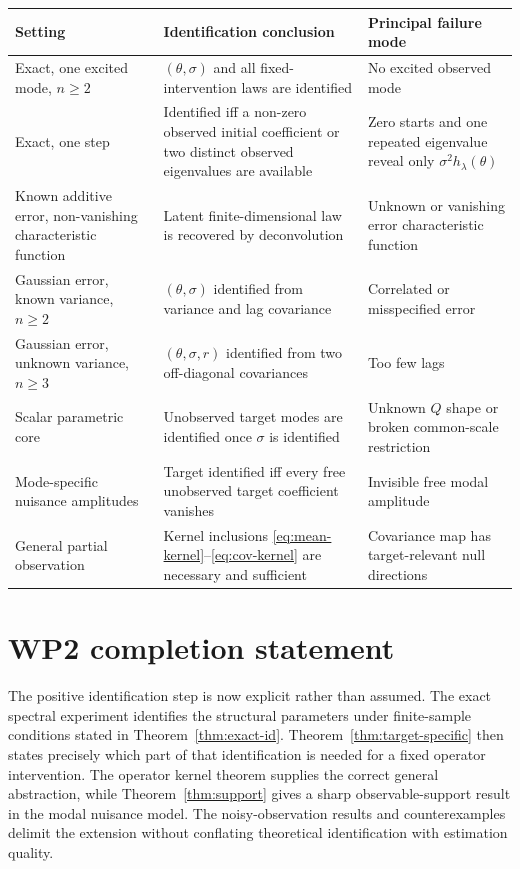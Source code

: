 \documentclass[11pt]{article}
\theoremstyle{remark}
\newcommand{\1}{\mathbf 1}
\begin{document}
\renewcommand{\arraystretch}{1.18}
\begin{tabularx}{\textwidth}{>{\raggedright\arraybackslash}p{} X X}
\toprule
Setting & Identification conclusion & Principal failure mode \\
\midrule
Exact, one excited mode, $n\ge2$ & $(\theta,\sigma)$ and all fixed-intervention laws are identified & No excited observed mode \\
Exact, one step & Identified iff a non-zero observed initial coefficient or two distinct observed eigenvalues are available & Zero starts and one repeated eigenvalue reveal only $\sigma^2h_\lambda(\theta)$ \\
Known additive error, non-vanishing characteristic function & Latent finite-dimensional law is recovered by deconvolution & Unknown or vanishing error characteristic function \\
Gaussian error, known variance, $n\ge2$ & $(\theta,\sigma)$ identified from variance and lag covariance & Correlated or misspecified error \\
Gaussian error, unknown variance, $n\ge3$ & $(\theta,\sigma,r)$ identified from two off-diagonal covariances & Too few lags \\
Scalar parametric core & Unobserved target modes are identified once $\sigma$ is identified & Unknown $Q$ shape or broken common-scale restriction \\
Mode-specific nuisance amplitudes & Target identified iff every free unobserved target coefficient vanishes & Invisible free modal amplitude \\
General partial observation & Kernel inclusions \eqref{eq:mean-kernel}--\eqref{eq:cov-kernel} are necessary and sufficient & Covariance map has target-relevant null directions \\
\bottomrule
\end{tabularx}

\section{WP2 completion statement}

The positive identification step is now explicit rather than assumed.  The exact spectral experiment identifies the structural parameters under finite-sample conditions stated in Theorem~\ref{thm:exact-id}.  Theorem~\ref{thm:target-specific} then states precisely which part of that identification is needed for a fixed operator intervention.  The operator kernel theorem supplies the correct general abstraction, while Theorem~\ref{thm:support} gives a sharp observable-support result in the modal nuisance model.  The noisy-observation results and counterexamples delimit the extension without conflating theoretical identification with estimation quality.
\end{document}
